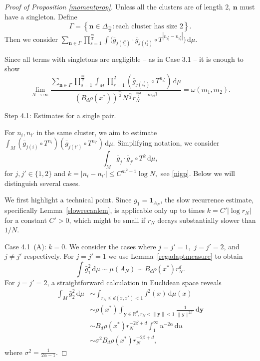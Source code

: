 \documentclass[10pt,a4paper]{amsart}
\def\one{{\mathbf{1}}}
\newcommand{\R}{\mathbb{R}}
\renewcommand{\d}{\, \text{d}}
\begin{document}
\begin{proof}[Proof of Proposition \ref{momentprop}]
Unless all the clusters are of length $2$, $\textbf{n}$ must have a singleton. Define
$$
\Gamma=\left\{\mathbf{n}\in \Delta_{\frac{m}{2}} : \text{each cluster has size } 2\right\}.
$$
Then we consider
$\sum_{\mathbf{n}\in\Gamma}\prod_{s=1}^{\frac{m}{2}}\int \big(\bar{g}_{j(i^s_1)} \cdot \bar{g}_{j(i^s_2)} \circ T^{|n_{i^s_2}-n_{i^s_1}|}\big)\d\mu.$

Since all terms with singletons are negligible -- as in Case 3.1 -- it is enough to show
\begin{equation}\label{momentgammaclaim}
\lim_{N\rightarrow \infty} \frac{\sum_{\textbf{n}\in \Gamma} \prod_{s=1}^{\frac{m}{2}} \int_M \prod_{r=1}^{2} (\bar{g}_{j(i^s_r)} \circ T^{n_{i^s_r}}) \d\mu}{\left(B_d \rho(x^*)\right)^{\frac{m}{2}} N^{\frac{m}{2}} r_N^{\frac{md}{2}-m_2\beta }} = \omega(m_1,m_2).
\end{equation}

Step 4.1: Estimates for a single pair.

For $n_i,n_{i'}$ in the same cluster, we aim to estimate $\int_M (\bar{g}_{j(i)} \circ T^{n_i})(\bar{g}_{j(i')} \circ T^{n_{i'}})\d\mu$. Simplifying notation, we consider
\begin{equation*}
\int_M \bar{g}_j \cdot \bar{g}_{j'} \circ T^k\d\mu,
\end{equation*}
for $j,j' \in \{1,2\}$ and $k=|n_i - n_{i'}| \leq C^{m^2+1} \log N,$ see \eqref{nigp}. Below we will distinguish several cases.


We first highlight a technical point. Since $g_1 = \one_{A_N}$, the slow recurrence estimate, specifically Lemma~\ref{slowrecanlem}, is applicable only up to times $k=C' |\log r_N|$ for a constant $C'>0$, which might be small if $r_N$ decays substantially slower than $1/N$.






Case 4.1~(A): $k=0$. We consider the cases where $j=j'=1,$ $j=j'=2$, and $j\neq j'$ respectively. For $j=j'=1$ we use Lemma~\ref{regadaptmeasure} to obtain
\begin{equation}\label{mainest1}
\int \bar{g}_1^2\d\mu\sim \mu(A_N)\sim B_d \rho(x^*) r_N^d.
\end{equation}
For $j=j'=2$, a straightforward calculation in Euclidean space reveals
\begin{equation}\label{mainest2}
\begin{aligned}
\int_M \bar{g}_2^2 \d\mu &\sim\int_{r_N \leq d(x,x^*) < 1} f^2(x)\d\mu(x)\\
&\sim \rho(x^*)\int_{\textbf{y}\in \R^d, r_N < \|\textbf{y}\| < 1} \frac{1}{\|\textbf{y}\|^{2\beta}} \d \textbf{y}\\
&\sim B_d \rho(x^*) r_N^{-2\beta+d} \int_1^{\infty} u^{-2\alpha} \d u \\
&\sim \sigma^2 B_d \rho(x^*) r_N^{-2\beta+d},
\end{aligned}
\end{equation}
where $\sigma^2=\frac{1}{2\alpha-1}$.



\end{proof}
\end{document}
